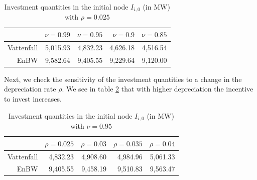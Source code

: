 \begin{table}[htb]
  \centering
  \caption{Investment quantities in the initial node $I_{i,0}$ (in MW) with $\rho=0.025$}
  \label{tab:invest_salv}
  \vspace{0.3cm}
\begin{tabular}{rrrrr}
\hline
           &       $\nu=0.99$ &       $\nu=0.95$ &        $\nu=0.9$ &       $\nu=0.85$ \\
\hline\hline
 Vattenfall  &      5,015.93  &      4,832.23  &      4,626.18  &      4,516.54  \\

     EnBW  &      9,582.64  &      9,405.55  &      9,229.64  &      9,120.00  \\
\hline
\end{tabular}  
\end{table}


Next, we check the sensitivity of the investment quantities to a change in  the depreciation rate $\rho$. We see in table \ref{tab:invest_depr} that with higher depreciation the incentive to invest increases.

\begin{table}[htb]
  \centering
  \caption{Investment quantities in the initial node $I_{i,0}$ (in MW) with $\nu=0.95$}
  \label{tab:invest_depr}
  \vspace{0.3cm}
\begin{tabular}{rrrrr}
\hline
           &      $\rho=0.025$ &       $\rho=0.03$ &      $\rho=0.035$ &       $\rho=0.04$ \\
\hline\hline
Vattenfall &      4,832.23  &      4,908.60  &      4,984.96  &      5,061.33  \\

      EnBW &      9,405.55  &      9,458.19  &      9,510.83  &      9,563.47  \\
\hline
\end{tabular}  
\end{table}



